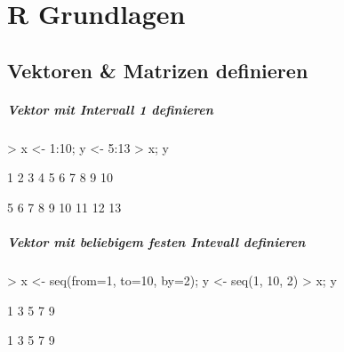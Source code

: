 



\chapter{R Grundlagen}
\newpage

\section{Vektoren \& Matrizen definieren}
\paragraph{Vektor mit Intervall 1 definieren}
\begin{Schunk}
\begin{Sinput}
> x <- 1:10; y <- 5:13
> x; y
\end{Sinput}
\begin{Soutput}
 [1]  1  2  3  4  5  6  7  8  9 10
\end{Soutput}
\begin{Soutput}
[1]  5  6  7  8  9 10 11 12 13
\end{Soutput}
\end{Schunk}

\paragraph{Vektor mit beliebigem festen Intevall definieren}
\begin{Schunk}
\begin{Sinput}
> x <- seq(from=1, to=10, by=2); y <- seq(1, 10, 2)
> x; y
\end{Sinput}
\begin{Soutput}
[1] 1 3 5 7 9
\end{Soutput}
\begin{Soutput}
[1] 1 3 5 7 9
\end{Soutput}
\end{Schunk}

